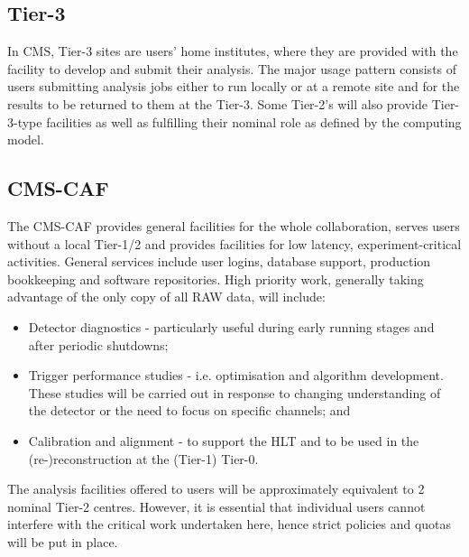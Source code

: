 
\subsection{Tier-3}
In CMS, Tier-3 sites are users' home institutes, where they are provided with the facility to develop and submit their analysis. The major usage pattern consists of users submitting analysis jobs either to run locally or at a remote site and for the results to be returned to them at the Tier-3. Some Tier-2's will also provide Tier-3-type facilities as well as fulfilling their nominal role as defined by the computing model.

\subsection{CMS-CAF}
The CMS-CAF provides general facilities for the whole collaboration, serves users without a local Tier-1/2 and provides facilities for low latency, experiment-critical activities. General services include user logins, database support, production bookkeeping and software repositories. High priority work, generally taking advantage of the only copy of all RAW data, will include:
\begin{itemize}
\item Detector diagnostics - particularly useful during early running stages and after periodic shutdowns;
\item Trigger performance studies - i.e. optimisation and algorithm development. These studies will be carried out in response to changing understanding of the detector or the need to focus on specific channels; and
\item Calibration and alignment - to support the HLT and to be used in the (re-)reconstruction at the (Tier-1) Tier-0.
\end{itemize}

The analysis facilities offered to users will be approximately equivalent to 2 nominal Tier-2 centres. However, it is essential that individual users cannot interfere with the critical work undertaken here, hence strict policies and quotas will be put in place.

